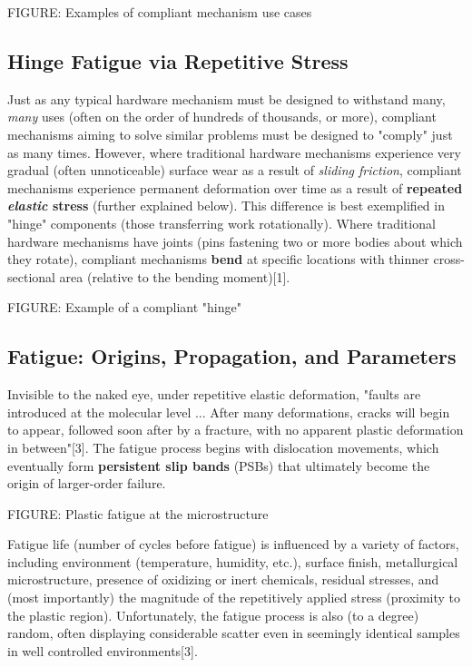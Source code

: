 \documentclass{report}
\begin{document}
FIGURE: Examples of compliant mechanism use cases

\subsection{Hinge Fatigue via Repetitive Stress}

Just as any typical hardware mechanism must be designed to withstand many, \textit{many} uses (often on the order of hundreds of thousands, or more), compliant mechanisms aiming to solve similar problems 
must be designed to "comply" just as many times. However, where traditional hardware mechanisms experience very gradual (often unnoticeable) surface wear as a result of \textit{sliding friction}, compliant mechanisms experience permanent deformation over time
as a result of \textbf{repeated \textit{elastic} stress} (further explained below). This difference is best exemplified in "hinge" components (those transferring work rotationally). Where traditional hardware mechanisms have joints (pins fastening two or more bodies about which they rotate), 
compliant mechanisms \textbf{bend} at specific locations with thinner cross-sectional area (relative to the bending moment)[1]. 

FIGURE: Example of a compliant "hinge"

\subsection{Fatigue: Origins, Propagation, and Parameters}

Invisible to the naked eye, under repetitive elastic deformation, "faults are introduced at the molecular level ... After many deformations, cracks will begin to appear, followed soon after by a fracture, with no apparent plastic deformation in between"[3].
The fatigue process begins with dislocation movements, which eventually form \textbf{persistent slip bands} (PSBs) that ultimately become the origin of larger-order failure.

FIGURE: Plastic fatigue at the microstructure

Fatigue life (number of cycles before fatigue) is influenced by a variety of factors, including environment (temperature, humidity, etc.), surface finish, metallurgical microstructure, presence of oxidizing or inert chemicals, residual stresses, and (most importantly) the magnitude of the repetitively applied stress (proximity to the plastic region). 
Unfortunately, the fatigue process is also (to a degree) random, often displaying considerable scatter even in seemingly identical samples in well controlled environments[3].
\end{document}
